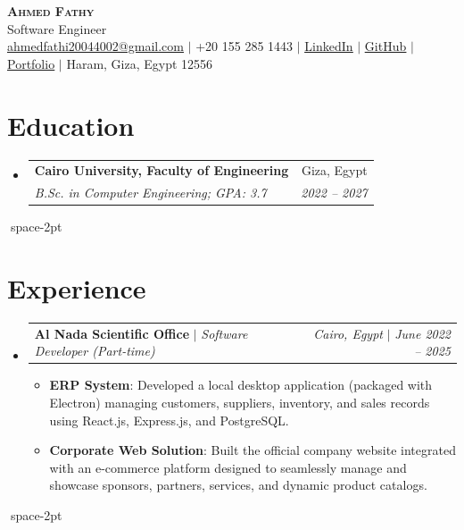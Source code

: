 \documentclass[letterpaper,11pt]{article}
\makeatletter
\newcommand{\resumeItem}[2]{\item\small{\textbf{#1}{: #2 \vspace{-3pt}}}}
\newcommand{\resumeSubheading}[4]{
  \vspace{-1pt}\item
    \begin{tabular*}{0.97\textwidth}{l@{\extracolsep{\fill}}r}
      \textbf{#1} & #2 \\
      \textit{\small#3} & \textit{\small #4} \\
    \end{tabular*}\vspace{-6pt}
}
\newcommand{\resumeActivitySubheading}[4]{
  \vspace{-1pt}\item
    \begin{tabular*}{0.97\textwidth}{l@{\extracolsep{\fill}}r}
      \textbf{#1} $|$ \textit{\small#3} & \textit{\small#2} $|$ \textit{\small #4} \\
    \end{tabular*}\vspace{-6pt}
}
\newcommand{\resumeSubHeadingListStart}{\begin{itemize}[leftmargin=*]}
\newcommand{\resumeSubHeadingListEnd}{\end{itemize}}
\newcommand{\resumeItemListStart}{\begin{itemize}}
\newcommand{\resumeItemListEnd}{\end{itemize}\vspace{-6pt}}
\makeatother
\begin{document}
\begin{center}
    \textbf{\Huge \scshape Ahmed Fathy} \\ \vspace{1pt}
    \small Software Engineer \\
    \href{mailto:ahmedfathi20044002@gmail.com}{\underline{ahmedfathi20044002@gmail.com}} $|$
    +20 155 285 1443 $|$
    \href{https://www.linkedin.com/in/ahmedfathy-x1}{\underline{LinkedIn}} $|$
    \href{https://github.com/ahmedfathy0-0}{\underline{GitHub}} $|$
    \href{https://www.mrfathi.tech/}{\underline{Portfolio}} $|$
    Haram, Giza, Egypt 12556
\end{center}


\section{Education}
  \resumeSubHeadingListStart
    \resumeSubheading
      {Cairo University, Faculty of Engineering}{Giza, Egypt}
      {B.Sc. in Computer Engineering;  GPA: 3.7}{2022 -- 2027}
  \resumeSubHeadingListEnd
  space{-2pt}
\section{Experience}
  \resumeSubHeadingListStart
    \resumeActivitySubheading
      {Al Nada Scientific Office}{Cairo, Egypt}{Software Developer (Part-time)}{June 2022 -- 2025}
      \resumeItemListStart
        \resumeItem{ERP System}
          {Developed a local desktop application (packaged with Electron) managing customers, suppliers, inventory, and sales records using React.js, Express.js, and PostgreSQL.}
        \resumeItem{Corporate Web Solution}
          {Built the official company website integrated with an e-commerce platform designed to seamlessly manage and showcase sponsors, partners, services, and dynamic product catalogs.}
      \resumeItemListEnd
  \resumeSubHeadingListEnd
  space{-2pt}
\end{document}
